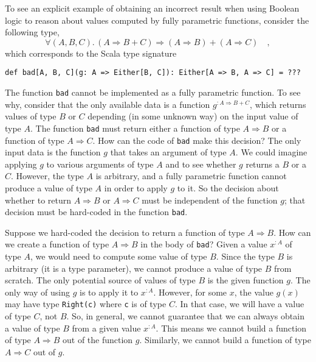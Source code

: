 To see an explicit example of obtaining an incorrect result when using
Boolean logic to reason about values computed by fully parametric
functions, consider the following type,
\begin{equation}
\forall(A,B,C).\,\left(A\Rightarrow B+C\right)\Rightarrow\left(A\Rightarrow B\right)+\left(A\Rightarrow C\right)\quad,\label{eq:ch-example-boolean-bad-type}
\end{equation}
which corresponds to the Scala type signature
\begin{lstlisting}
def bad[A, B, C](g: A => Either[B, C]): Either[A => B, A => C] = ???
\end{lstlisting}
The function \lstinline!bad! cannot be implemented as a fully parametric
function. To see why, consider that the only available data is a function
$g^{:A\Rightarrow B+C}$, which returns values of type $B$ or $C$
depending (in some unknown way) on the input value of type $A$. The
function \lstinline!bad! must return either a function of type $A\Rightarrow B$
or a function of type $A\Rightarrow C$. How can the code of \lstinline!bad!
make this decision? The only input data is the function $g$ that
takes an argument of type $A$. We could imagine applying $g$ to
various arguments of type $A$ and to see whether $g$ returns a $B$
or a $C$. However, the type $A$ is arbitrary, and a fully parametric
function cannot produce a value of type $A$ in order to apply $g$
to it. So the decision about whether to return $A\Rightarrow B$ or
$A\Rightarrow C$ must be independent of the function $g$; that decision
must be hard-coded in the function \lstinline!bad!.

Suppose we hard-coded the decision to return a function of type $A\Rightarrow B$.
How can we create a function of type $A\Rightarrow B$ in the body
of \lstinline!bad!? Given a value $x^{:A}$ of type $A$, we would
need to compute some value of type $B$. Since the type $B$ is arbitrary
(it is a type parameter), we cannot produce a value of type $B$ from
scratch. The only potential source of values of type $B$ is the given
function $g$. The only way of using $g$ is to apply it to $x^{:A}$.
However, for some $x$, the value $g(x)$ may have type \lstinline!Right(c)!
where \lstinline!c! is of type $C$. In that case, we will have a
value of type $C$, not $B$. So, in general, we cannot guarantee
that we can always obtain a value of type $B$ from a given value
$x^{:A}$. This means we cannot build a function of type $A\Rightarrow B$
out of the function $g$. Similarly, we cannot build a function of
type $A\Rightarrow C$ out of $g$. 

